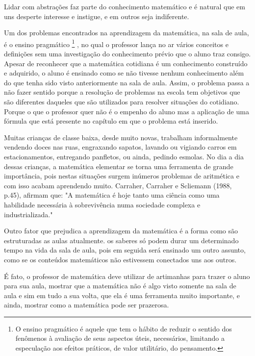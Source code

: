 \documentclass[brasil]{abnt}
\begin{document}
    Lidar com abstrações faz parte do conhecimento matemático e é natural que em uns desperte interesse e instigue, e em outros seja indiferente.
    
    Um dos problemas encontrados na aprendizagem da matemática, na sala de aula, é o ensino pragmático
    \footnote{O ensino pragmático é aquele que tem o hábito de reduzir o sentido dos fenômenos à avaliação de seus aspectos úteis, necessários, limitando a especulação aos efeitos práticos, de valor utilitário, do pensamento.}
    , no qual o professor lança no ar vários conceitos e definições sem uma investigação 
    do conhecimento prévio que o aluno traz consigo. Apesar de reconhecer que a matemática cotidiana é um conhecimento construído e adquirido, o aluno é ensinado como se não tivesse nenhum conhecimento 
    além do que tenha sido visto anteriormente na sala de aula. Assim, o problema passa a não fazer sentido porque a resolução de problemas na escola tem objetivos que são diferentes daqueles que são 
    utilizados para resolver situações do cotidiano. Porque o que o professor quer não é o empenho do aluno mas a aplicação de uma fórmula que está presente no capítulo em que o problema está inserido.
    
    Muitas crianças de classe baixa, desde muito novas, trabalham informalmente vendendo doces nas ruas, engraxando sapatos, lavando ou vigiando carros em estacionamentos, entregando 
    panfletos, ou ainda, pedindo esmolas. No dia a dia dessas crianças, a matemática elementar se torna uma ferramenta de grande importância, pois nestas situações surgem inúmeros problemas de aritmética  
    e com isso acabam aprendendo muito. Carraher, Carraher e Scliemann (1988, p.45), afirmam que: "A matemática é hoje tanto uma ciência como uma habilidade necessária à sobrevivência numa sociedade 
    complexa e industrializada."
    
    Outro fator que prejudica a aprendizagem da matemática é a forma como são estruturadas as aulas atualmente. os saberes só podem durar um determinado tempo na vida da sala de aula, pois em seguida 
    será ensinado um outro assunto, como se os conteúdos matemáticos não estivessem conectados uns aos outros.
   
    É fato, o professor de matemática deve utilizar de artimanhas para trazer o aluno para sua aula, mostrar que a matemática não é algo visto somente na sala de aula e sim em tudo a sua volta, que ela é uma 
    ferramenta muito importante, e ainda, mostrar como a matemática pode ser prazerosa.
       
\end{document}

